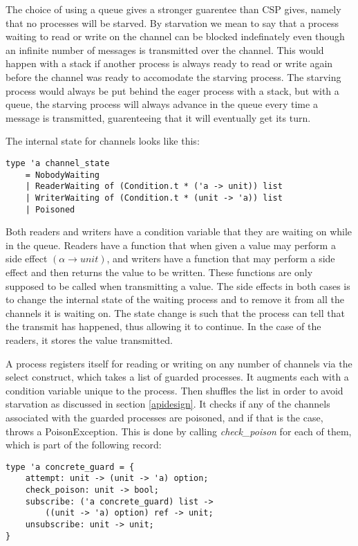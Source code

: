 \documentclass[a4paper,12pt]{article}
\begin{document}
The choice of using a queue gives a stronger guarentee than CSP gives, namely that no processes
will be starved. By starvation we mean to say that a process waiting to read or write on the
channel can be blocked indefinately even though an infinite number of messages is transmitted
over the channel. This would happen with a stack if another process is always ready to read or 
write again before the channel was ready to accomodate the starving process. The starving process
would always be put behind the eager process with a stack, but with a queue, the starving process
will always advance in the queue every time a message is transmitted, guarenteeing that it will
eventually get its turn.

\goodbreak
The internal state for channels looks like this:

\begin{verbatim}
type 'a channel_state
    = NobodyWaiting 
    | ReaderWaiting of (Condition.t * ('a -> unit)) list
    | WriterWaiting of (Condition.t * (unit -> 'a)) list
    | Poisoned
\end{verbatim}

Both readers and writers have a condition variable that they are waiting on
while in the queue. Readers have a function that when given a value may perform
a side effect $(\alpha \to unit)$, and writers have a function that may perform
a side effect and then returns the value to be written. These functions are
only supposed to be called when transmitting a value. The side effects in both
cases is to change the internal state of the waiting process and to remove it
from all the channels it is waiting on. The state change is such that the
process can tell that the transmit has happened, thus allowing it to continue.
In the case of the readers, it stores the value transmitted.

A process registers itself for reading or writing on any number of channels via
the select construct, which takes a list of guarded processes. It augments each
with a condition variable unique to the process. Then shuffles the list in order
to avoid starvation as discussed in section \ref{apidesign}. It checks if any
of the channels associated with the guarded processes are poisoned, and if
that is the case, throws a PoisonException. This is done by calling
\emph{check\_poison} for each of them, which is part of the following record:

\begin{verbatim}
type 'a concrete_guard = {
    attempt: unit -> (unit -> 'a) option;
    check_poison: unit -> bool;
    subscribe: ('a concrete_guard) list -> 
        ((unit -> 'a) option) ref -> unit;
    unsubscribe: unit -> unit;
}
\end{verbatim}
\end{document}
